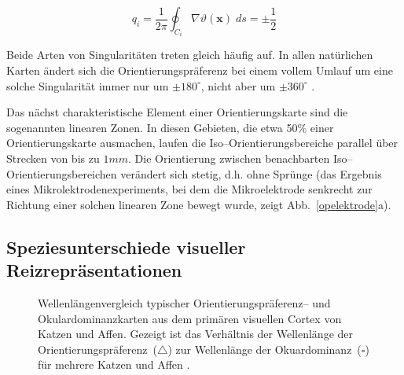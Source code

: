 \begin{equation}
    q_i=\frac{1}{2\pi}\oint_{C_i}\!\!\nabla\vartheta(\mathbf{x})\;ds = \pm
    \frac{1}{2}
    \label{chi}
\end{equation}

Beide Arten von Singularitäten treten gleich häufig auf. In allen
natürlichen Karten ändert sich die Orientierungspräferenz bei einem
vollem Umlauf um eine solche Singularität immer nur um $\pm 180^\circ$,
nicht aber um $\pm 360^\circ$ \parencite[einen Überblick
über alle theoretisch möglichen Arten solcher Punktdefekte gibt][]{penrose:1979}.

Das nächst charakteristische Element einer Orientierungskarte sind die
sogenannten linearen Zonen. In diesen Gebieten, die etwa 50\% einer
Orientierungskarte ausmachen, laufen die Iso--Orientierungsbereiche
parallel über Strecken von bis zu $1mm$. Die Orientierung zwischen
benachbarten Iso--Orientierungsbereichen verändert sich stetig, d.h. ohne
Sprünge (das Ergebnis eines Mikrolektrodenexperiments, bei dem die
Mikroelektrode senkrecht zur Richtung einer solchen linearen Zone bewegt
wurde, zeigt Abb.~\ref{opelektrode}a).

\subsection{Speziesunterschiede visueller Reizrepräsentationen}
\label{unterschiede}

\begin{figure}[p]
    \centering
    \caption{Layoutvergleich kolumnärer Strukturen aus dem primären visuellen
    Cortex von Katzen \parencite[Daten aus][]{loewel:1987,loewel:1990} und Affen
        \parencite[Daten aus][]{blasdel:1992a}.}
    \label{layout}

    \begin{center}
    \end{center}
    \caption{Wellenlängenvergleich typischer Orientierungspräferenz-- und
    Okulardominanzkarten aus dem primären visuellen Cortex von Katzen und
    Affen. Gezeigt ist das Verhältnis der Wellenlänge der
    Orientierungspräferenz~($\triangle$) zur Wellenlänge der
    Okuardominanz~($\square$) für mehrere Katzen
        \parencite[links, Daten aus][]{loewel:1988} und Affen
        \parencite[rechts, Daten aus][]{oby:1993b}.}
    \label{wavelength}
\end{figure}

